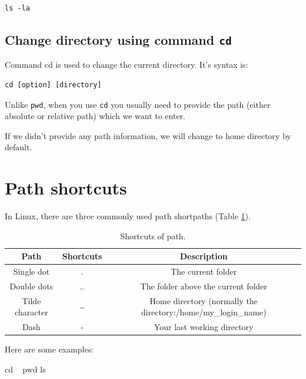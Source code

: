 \documentclass[]{book}
\makeatletter
\newenvironment{Shaded}{\begin{snugshade}}{\end{snugshade}}
\newcommand{\BuiltInTok}[1]{#1}
\newcommand{\FunctionTok}[1]{\textcolor[rgb]{0.00,0.00,0.00}{#1}}
\newcommand{\NormalTok}[1]{#1}
\newenvironment{kframe}{%
\medskip{}
\setlength{\fboxsep}{.8em}
 \def\at@end@of@kframe{}%
 \ifinner\ifhmode%
  \def\at@end@of@kframe{\end{minipage}}%
  \begin{minipage}{\columnwidth}%
 \fi\fi%
 \def\FrameCommand##1{\hskip\@totalleftmargin \hskip-\fboxsep
 \colorbox{shadecolor}{##1}\hskip-\fboxsep
     \hskip-\linewidth \hskip-\@totalleftmargin \hskip\columnwidth}%
 \MakeFramed {\advance\hsize-\width
   \@totalleftmargin\z@ \linewidth\hsize
   \@setminipage}}%
 {\par\unskip\endMakeFramed%
 \at@end@of@kframe}
\renewenvironment{Shaded}{\begin{kframe}}{\end{kframe}}
\makeatother
\begin{document}
\begin{verbatim}
ls -la 
\end{verbatim}

\hypertarget{change-directory-using-command-cd}{%
\subsection{\texorpdfstring{Change directory using command \texttt{cd}}{Change directory using command cd}}\label{change-directory-using-command-cd}}

Command cd is used to change the current directory. It's syntax is:

\begin{verbatim}
cd [option] [directory]
\end{verbatim}

Unlike \texttt{pwd}, when you use \texttt{cd} you usually need to provide the path (either absolute or relative path) which we want to enter.

If we didn't provide any path information, we will change to home directory by default.

\hypertarget{path-shortcuts}{%
\section{Path shortcuts}\label{path-shortcuts}}

In Linux, there are three commonly used path shortpaths (Table \ref{tab:linuxPathShortcuts}).



\begin{table}[t]

\caption{\label{tab:linuxPathShortcuts}Shortcuts of path.}
\centering
\begin{tabular}{c|c|c}
\hline
Path & Shortcuts & Description\\
\hline
Single dot & . & The current folder\\
\hline
Double dots & .. & The folder above the current folder\\
\hline
Tilde character & \textasciitilde{} & Home directory (normally the directory:/home/my\_login\_name)\\
\hline
Dash & - & Your last working directory\\
\hline
\end{tabular}
\end{table}

Here are some examples:

\begin{Shaded}
\begin{Highlighting}[]
\BuiltInTok{cd}\NormalTok{ ~}
\BuiltInTok{pwd}
\FunctionTok{ls}
\end{Highlighting}
\end{Shaded}
\end{document}
